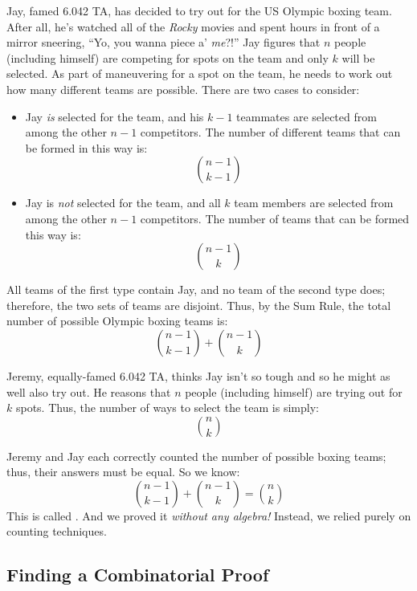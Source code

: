 Jay, famed 6.042 TA, has decided to try out for the US Olympic
boxing team.  After all, he's watched all of the \emph{Rocky} movies
and spent hours in front of a mirror sneering, ``Yo, you wanna piece
a' \emph{me}?!''  Jay figures that $n$ people (including himself)
are competing for spots on the team and only $k$ will be selected.  As
part of maneuvering for a spot on the team, he needs to work out how
many different teams are possible.  There are two cases to consider:

\begin{itemize}
  
\item Jay \emph{is} selected for the team, and his $k - 1$
  teammates are selected from among the other $n - 1$ competitors.
  The number of different teams that can be formed in this way is:
%
\[
\binom{n-1}{k-1}
\]

\item Jay is \emph{not} selected for the team, and all $k$ team
members are selected from among the other $n - 1$ competitors.  The
number of teams that can be formed this way is:
%
\[
\binom{n - 1}{k}
\]

\end{itemize}

All teams of the first type contain Jay, and no team of the second
type does; therefore, the two sets of teams are disjoint.  Thus, by
the Sum Rule, the total number of possible Olympic boxing teams is:
%
\[
\binom{n-1}{k-1} + \binom{n - 1}{k}
\]

Jeremy, equally-famed 6.042 TA, thinks Jay isn't so tough and so
he might as well also try out.  He reasons that $n$ people (including
himself) are trying out for $k$ spots.  Thus, the number of ways to
select the team is simply:
%
\[
\binom{n}{k}
\]

Jeremy and Jay each correctly counted the number of possible boxing
teams; thus, their answers must be equal.  So we know:
%
\[
\binom{n-1}{k-1} + \binom{n - 1}{k} = \binom{n}{k}
\]
%
This is called .  And we proved it
\emph{without any algebra!}  Instead, we relied purely on counting
techniques.

\subsection{Finding a Combinatorial Proof}

